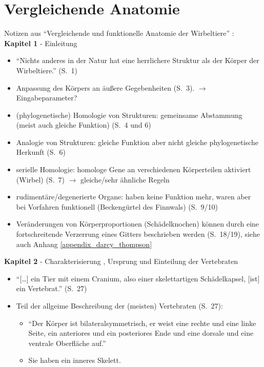 
\chapter{Vergleichende Anatomie}
\label{appendix_vergleichende_anatomie}

Notizen aus "`Vergleichende und funktionelle Anatomie der Wirbeltiere"' \cite{Vergleichende_Anatomie}:\\

\textbf{Kapitel 1} - Einleitung
\begin{itemize}
 \item "`Nichts anderes in der Natur hat eine herrlichere Struktur als der Körper der Wirbeltiere."' (S.\ 1)
 \item Anpassung des Körpers an äußere Gegebenheiten (S.\ 3). $\rightarrow$ Eingabeparameter?
 \item (phylogenetische) Homologie von Strukturen: gemeinsame Abstammung (meist auch gleiche Funktion) (S.\ 4 und 6)
 \item Analogie von Strukturen: gleiche Funktion aber nicht gleiche phylogenetische Herkunft (S.\ 6)
 \item serielle Homologie: homologe Gene an verschiedenen Körperteilen aktiviert (\zb Wirbel) (S.\ 7) $\rightarrow$ gleiche/sehr ähnliche Regeln
 \item rudimentäre/degenerierte Organe: haben keine Funktion mehr, waren aber bei Vorfahren funktionell (\zb Beckengürtel des Finnwals) (S.\ 9/10)
 \item Veränderungen von Körperproportionen (\zb Schädelknochen) können durch eine fortschreitende Verzerrung eines Gitters beschrieben werden (S.\ 18/19), siehe auch  Anhang \ref{appendix_darcy_thompson}
\end{itemize}

\textbf{Kapitel 2} - Charakterisierung , Ursprung und Einteilung der Vertebraten
\begin{itemize}
 \item "`[\dots] ein Tier mit einem Cranium, also einer skelettartigen Schädelkapsel, [ist] ein Vertebrat."' (S.\ 27)
 \item Teil der allgeime Beschreibung der (meisten) Vertebraten (S.\ 27): 
 \begin{itemize}
  \item "`Der Körper ist bilateralsymmetrisch, \dash er weist eine rechte und eine linke Seite, ein anteriores und ein posteriores Ende und eine dorsale und eine ventrale Oberfläche auf."'
  \item Sie haben ein inneres Skelett.
 \end{itemize}
\end{itemize}

